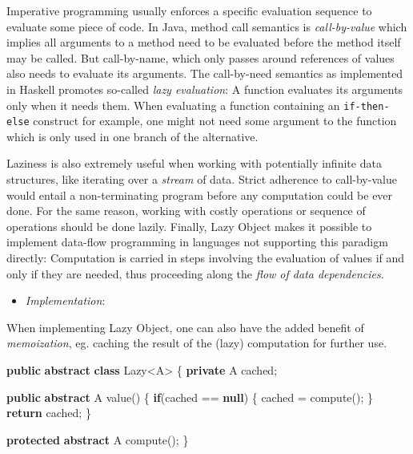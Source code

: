 \documentclass[11pt,]{article}
\newenvironment{Shaded}{}{}
\newcommand{\KeywordTok}[1]{\textcolor[rgb]{0.00,0.44,0.13}{\textbf{{#1}}}}
\newcommand{\FunctionTok}[1]{\textcolor[rgb]{0.02,0.16,0.49}{{#1}}}
\newcommand{\NormalTok}[1]{{#1}}
\begin{document}
Imperative programming usually enforces a specific evaluation sequence
to evaluate some piece of code. In Java, method call semantics is
\emph{call-by-value} which implies all arguments to a method need to be
evaluated before the method itself may be called. But call-by-name,
which only passes around references of values also needs to evaluate its
arguments. The call-by-need semantics as implemented in Haskell promotes
so-called \emph{lazy evaluation}: A function evaluates its arguments
only when it needs them. When evaluating a function containing an
\texttt{if-then-else} construct for example, one might not need some
argument to the function which is only used in one branch of the
alternative.

Laziness is also extremely useful when working with potentially infinite
data structures, like iterating over a \emph{stream} of data. Strict
adherence to call-by-value would entail a non-terminating program before
any computation could be ever done. For the same reason, working with
costly operations or sequence of operations should be done lazily.
Finally, Lazy Object makes it possible to implement data-flow
programming in languages not supporting this paradigm directly:
Computation is carried in steps involving the evaluation of values if
and only if they are needed, thus proceeding along the \emph{flow of
data dependencies}.

\begin{itemize}
\item
  \emph{Implementation}:
\end{itemize}

When implementing Lazy Object, one can also have the added benefit of
\emph{memoization}, eg. caching the result of the (lazy) computation for
further use.

\begin{Shaded}
\begin{Highlighting}[]
\KeywordTok{public} \KeywordTok{abstract} \KeywordTok{class} \NormalTok{Lazy<A> \{}
  \KeywordTok{private} \NormalTok{A cached;}
  
  \KeywordTok{public} \KeywordTok{abstract} \NormalTok{A }\FunctionTok{value}\NormalTok{() \{}
     \KeywordTok{if}\NormalTok{(cached == }\KeywordTok{null}\NormalTok{) \{}
         \NormalTok{cached = }\FunctionTok{compute}\NormalTok{();}
     \NormalTok{\}}
     \KeywordTok{return} \NormalTok{cached;}
  \NormalTok{\}}

  \KeywordTok{protected} \KeywordTok{abstract} \NormalTok{A }\FunctionTok{compute}\NormalTok{();}
\NormalTok{\}}
\end{Highlighting}
\end{Shaded}
\end{document}
